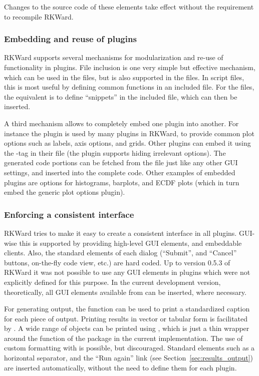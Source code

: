 Changes to the source code of these elements take effect without the requirement to recompile RKWard.

\subsubsection{Embedding and reuse of plugins}
\label{sec:technical_plugins_embedding}
RKWard supports several mechanisms for modularization and re-use of
functionality in plugins. File inclusion is one very simple but effective
mechanism, which can be used in the  files, but is also supported in
the  files. In script files, this is most useful by defining common functions
in an included file. For the  files, the equivalent is to define ``snippets''
in the included file, which can then be inserted.

A third mechanism allows to completely embed one plugin into another. For
instance the  plugin is used by many plugins in RKWard, to provide
common plot options such as labels, axis options, and grids. Other plugins
can embed it using the -tag in their  file (the plugin supports
hiding irrelevant options). The generated code portions can be fetched from the
 file just like any other GUI settings, and inserted into the complete
code. Other examples of embedded plugins are options for histograms, barplots,
and ECDF plots (which in turn embed the generic plot options plugin).

\subsubsection{Enforcing a consistent interface}
\label{sec:technical_plugins_consistency}
RKWard tries to make it easy to create a consistent interface in all plugins.
GUI-wise this is supported by providing high-level GUI elements, and embeddable
clients. Also, the standard elements of each dialog (``Submit'', and
``Cancel'' buttons, on-the-fly code view, etc.) are hard coded. Up to version
0.5.3 of RKWard it was not possible to use any GUI elements in plugins which
were not explicitly defined for this purpose. In the current development
version, theoretically, all GUI elements available from  can be inserted,
where necessary.

For generating output, the function  can be used to print a
standardized caption for each piece of output. Printing results in vector or
tabular form is facilitated by . A wide range of objects can be
printed using , which is just a thin wrapper around the
 function of the  package \citep{Lecoutre2003} in the current
implementation. The use of custom formatting with  is possible, but
discouraged. Standard elements such as a horizontal separator, and the ``Run again''
link (see Section~\ref{sec:results_output}) are inserted automatically, without the need to define
them for each plugin.


